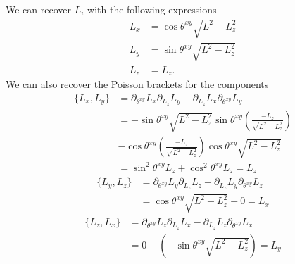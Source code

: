 We can recover $L_i$ with the following expressions
\begin{equation}
	\begin{aligned}
		L_x &= \cos \theta^{xy} \sqrt{L^2 - L_z^2} \\
		L_y &= \sin \theta^{xy} \sqrt{L^2 - L_z^2} \\
		L_z &= L_z.
	\end{aligned}
\end{equation}
We can also recover the Poisson brackets for the components
\begin{equation}
	\begin{aligned}
		\{L_x, L_y\} &= \partial_{\theta^{xy}} L_x \partial_{L_{z}} L_y - \partial_{L_{z}} L_x \partial_{\theta^{xy}} L_y \\
		&= - \sin \theta^{xy} \sqrt{L^2 - L_z^2} \sin \theta^{xy} \left(\frac{- L_z}{\sqrt{L^2 - L_z^2}}\right) \\
		& - \cos \theta^{xy} \left(\frac{- L_z}{\sqrt{L^2 - L_z^2}}\right) \cos \theta^{xy} \sqrt{L^2 - L_z^2} \\
		&= \sin^2 \theta^{xy} L_z + \cos^2 \theta^{xy} L_z = L_z
	\end{aligned}
\end{equation}
\begin{equation}
	\begin{aligned}
		\{L_y, L_z\} &= \partial_{\theta^{xy}} L_y \partial_{L_{z}} L_z - \partial_{L_{z}} L_y \partial_{\theta^{xy}} L_z \\
		&= \cos \theta^{xy} \sqrt{L^2 - L_z^2} - 0 = L_x
	\end{aligned}
\end{equation}
\begin{equation}
	\begin{aligned}
		\{L_z, L_x\} &= \partial_{\theta^{xy}} L_z \partial_{L_{z}} L_x - \partial_{L_{z}} L_z \partial_{\theta^{xy}} L_x \\
		&= 0 - (- \sin \theta^{xy} \sqrt{L^2 - L_z^2}) = L_y
	\end{aligned}
\end{equation}

